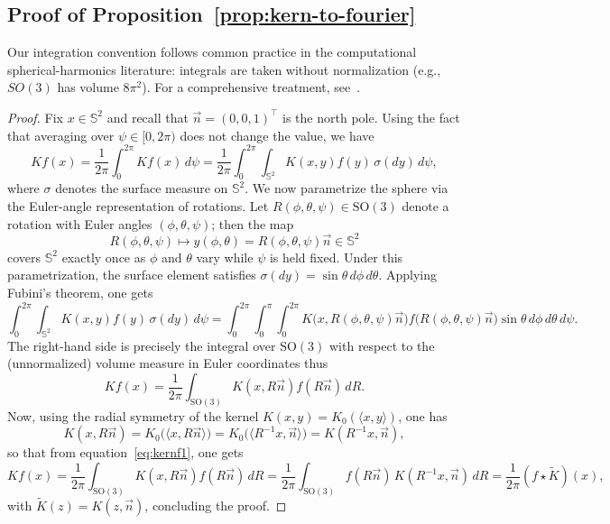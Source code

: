 \documentclass{article}
\theoremstyle{plain}
\theoremstyle{definition}
\theoremstyle{remark}
\renewcommand{\S}{\ensuremath{\mathbb{S}}}
\begin{document}
\subsection{Proof of Proposition~\ref{prop:kern-to-fourier}}\label{app:proof:kern-to-fourier}
Our integration convention follows common practice in the computational spherical-harmonics literature: integrals are taken without normalization (e.g., $SO(3)$ has volume $8\pi^{2}$). For a comprehensive treatment, see~\cite{driscoll1994computing,faraut2008analysis}.
\begin{proof}
Fix $x \in \S^2$ and recall that $\vec{n} = (0,0,1)^\top$ is the north pole. Using the fact that averaging over $\psi \in [0,2\pi)$ does not change the value, we have
\[
Kf(x) = \frac{1}{2\pi}\int_{0}^{2\pi} Kf(x) \, d\psi
= \frac{1}{2\pi} \int_{0}^{2\pi} \int_{\S^2} K(x,y) f(y) \, \sigma(dy) \, d\psi,
\]
where $\sigma$ denotes the surface measure on $\S^2$.
We now parametrize the sphere via the Euler-angle representation of rotations. Let $R(\phi,\theta,\psi) \in \mathrm{SO}(3)$ denote a rotation with Euler angles $(\phi,\theta,\psi)$; then the map
\begin{equation*}	
R(\phi,\theta,\psi) \mapsto y(\phi,\theta) = R(\phi,\theta,\psi)\vec{n} \in \S^2
\end{equation*}
covers $\S^2$ exactly once as $\phi$ and $\theta$ vary while $\psi$ is held fixed. Under this parametrization, the surface element satisfies $\sigma(dy) = \sin\theta \, d\phi \, d\theta$. Applying Fubini's theorem, one gets
\[
\int_{0}^{2\pi} \int_{\S^2} K(x,y) f(y) \, \sigma(dy) \, d\psi
= \int_{0}^{2\pi}\int_{0}^{\pi}\int_{0}^{2\pi} 
K\bigl(x,R(\phi,\theta,\psi)\vec{n}\bigr) f\bigl(R(\phi,\theta,\psi)\vec{n}\bigr) 
\sin\theta \, d\phi \, d\theta \, d\psi.
\]
The right-hand side is precisely the integral over $\mathrm{SO}(3)$ with respect to the (unnormalized) volume measure in Euler coordinates thus
\begin{equation}\label{eq:kernf1}
Kf(x) = \frac{1}{2\pi}\int_{\mathrm{SO}(3)} K(x,R\vec{n}) f(R\vec{n}) \, dR.
\end{equation}
Now, using the radial symmetry of the kernel $K(x,y) = K_0(\langle x,y\rangle)$, one has
\[
K(x,R\vec{n}) = K_0\bigl(\langle x, R\vec{n}\rangle\bigr) 
= K_0\bigl(\langle R^{-1}x, \vec{n}\rangle\bigr)
= K(R^{-1}x, \vec{n}),
\]
so that from equation~\eqref{eq:kernf1}, one gets
\[
Kf(x) = \frac{1}{2\pi}\int_{\mathrm{SO}(3)} K(x,R\vec{n}) f(R\vec{n}) \, dR
= \frac{1}{2\pi}\int_{\mathrm{SO}(3)} f(R\vec{n}) \, K(R^{-1}x, \vec{n}) \, dR
= \frac{1}{2\pi}(f \star \tilde K)(x),
\]
with $\tilde K(z) = K(z, \vec{n})$, concluding the proof.
\end{proof}
\end{document}
